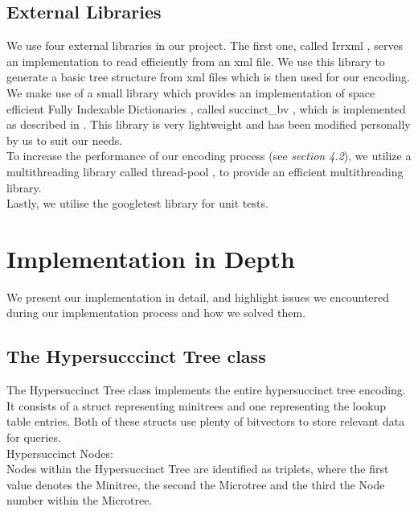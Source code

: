 \documentclass{article}
\begin{document}
\subsection{External Libraries}
We use four external libraries in our project.
The first one, called Irrxml \cite{irrXMLLink}, serves an implementation to read efficiently from an xml file. We use this library to generate a basic tree structure from xml files which is then used for our encoding.\\
We make use of a small library which provides an implementation of space efficient Fully Indexable Dictionaries \cite{universalSuccinct}, called succinct\_bv \cite{succinctBVLink}, which is implemented as described in \cite{succinctBV}.
This library is very lightweight and has been modified personally by us to suit our needs.\\
To increase the performance of our encoding process (see \textit{section 4.2}), we utilize a multithreading library called thread-pool \cite{threading}, to provide an efficient multithreading library.\\
Lastly, we utilise the googletest library \cite{googletestLink} for unit tests.

\section{Implementation in Depth}
We present our implementation in detail, and highlight issues we encountered during our implementation process and how we solved them.
\subsection{The Hypersucccinct Tree class}
The Hypersuccinct Tree class implements the entire hypersuccinct tree encoding. It consists of a struct representing minitrees and one representing the lookup table entries.
Both of these structs use plenty of bitvectors to store relevant data for queries.\\

Hypersuccinct Nodes:\\
Nodes within the Hypersuccinct Tree are identified as triplets, where the first value denotes the Minitree, the second the Microtree and the third the Node number within the Microtree.\\
\end{document}
